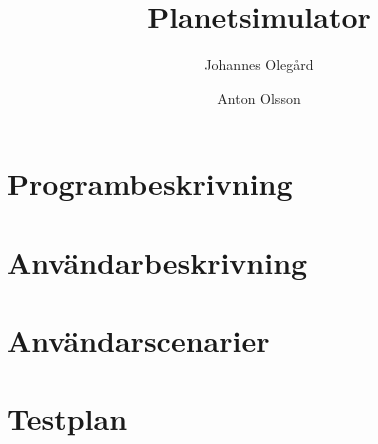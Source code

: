 \documentclass[a4paper, 11pt]{article}
\title{Planetsimulator}
\author{Johannes Olegård \and Anton Olsson}
\begin{document}
\maketitle

\section{Programbeskrivning}
\label{sec:progb}



\vspace{12pt}



\vspace{12pt}



\section{Användarbeskrivning}
\label{sec:anvb}



\vspace{12pt}



\vspace{12pt}



\section{Användarscenarier}
\label{sec:anvsc}



\vspace{12pt}



\vspace{12pt}



\section{Testplan}
\label{sec:testplan}



\vspace{12pt}



\vspace{12pt}
\end{document}
